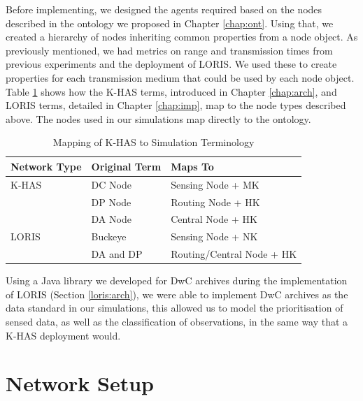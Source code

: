 Before implementing, we designed the agents required based on the nodes described in the ontology we proposed in Chapter \ref{chap:ont}. Using that, we created a hierarchy of nodes inheriting common properties from a node object. As previously mentioned, we had metrics on range and transmission times from previous experiments and the deployment of LORIS. We used these to create properties for each transmission medium that could be used by each node object. Table \ref{sim:tab:terms} shows how the K-HAS terms, introduced in Chapter \ref{chap:arch}, and LORIS terms, detailed in Chapter \ref{chap:imp}, map to the node types described above. The nodes used in our simulations map directly to the ontology.

	\begin{table}[h]
	\centering
	\begin{tabular}{|l|l|l|}
	\hline
	\textbf{Network Type} & \textbf{Original Term} & \textbf{Maps To}          \\
	\hline
	K-HAS                 & DC Node                & Sensing Node + MK         \\
	                      & DP Node                & Routing Node + HK         \\
	                      & DA Node                & Central Node + HK         \\
	LORIS                 & Buckeye                & Sensing Node + NK         \\
	                      & DA and DP              & Routing/Central Node + HK \\
	\hline
	\end{tabular}
	\caption{Mapping of K-HAS to Simulation Terminology}
	\label{sim:tab:terms}
	\end{table}

Using a Java library we developed for DwC archives during the implementation of LORIS (Section \ref{loris:arch}), we were able to implement DwC archives as the data standard in our simulations, this allowed us to model the prioritisation of sensed data, as well as the classification of observations, in the same way that a K-HAS deployment would.

\section{Network Setup}\label{sim:setup}

